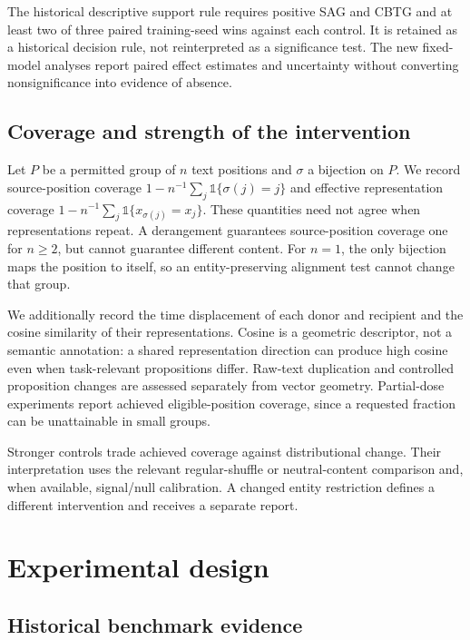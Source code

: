 \documentclass[preprint,11pt]{elsarticle}
\begin{document}
The historical descriptive support rule requires positive SAG and CBTG and at least two of three paired training-seed wins against each control. It is retained as a historical decision rule, not reinterpreted as a significance test. The new fixed-model analyses report paired effect estimates and uncertainty without converting nonsignificance into evidence of absence.

\subsection{Coverage and strength of the intervention}

Let $P$ be a permitted group of $n$ text positions and $\sigma$ a bijection on $P$. We record source-position coverage $1-n^{-1}\sum_j\mathbb{1}\{\sigma(j)=j\}$ and effective representation coverage $1-n^{-1}\sum_j\mathbb{1}\{x_{\sigma(j)}=x_j\}$. These quantities need not agree when representations repeat. A derangement guarantees source-position coverage one for $n\geq2$, but cannot guarantee different content. For $n=1$, the only bijection maps the position to itself, so an entity-preserving alignment test cannot change that group.

We additionally record the time displacement of each donor and recipient and the cosine similarity of their representations. Cosine is a geometric descriptor, not a semantic annotation: a shared representation direction can produce high cosine even when task-relevant propositions differ. Raw-text duplication and controlled proposition changes are assessed separately from vector geometry. Partial-dose experiments report achieved eligible-position coverage, since a requested fraction can be unattainable in small groups.

Stronger controls trade achieved coverage against distributional change. Their interpretation uses the relevant regular-shuffle or neutral-content comparison and, when available, signal/null calibration. A changed entity restriction defines a different intervention and receives a separate report.



\section{Experimental design}
\label{sec:design}

\subsection{Historical benchmark evidence}
\end{document}
